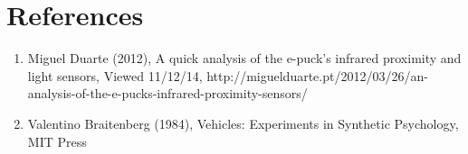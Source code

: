 \documentclass[11pt]{article}
\begin{document}
\section*{References}

\begin{enumerate}
\item{Miguel Duarte (2012), A quick analysis of the e-puck's infrared proximity and light sensors, Viewed 11/12/14, http://miguelduarte.pt/2012/03/26/an-analysis-of-the-e-pucks-infrared-proximity-sensors/}
\item{Valentino Braitenberg (1984), Vehicles: Experiments in Synthetic Psychology, MIT Press}
\end{enumerate}
\end{document}
